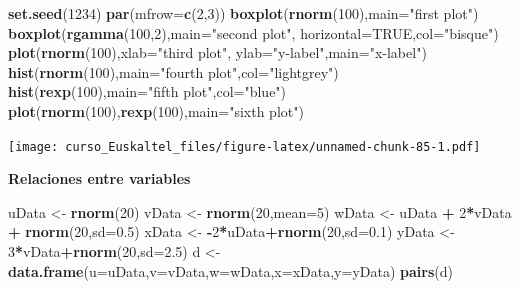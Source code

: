 \documentclass[]{book}
\newenvironment{Shaded}{\begin{snugshade}}{\end{snugshade}}
\newcommand{\KeywordTok}[1]{\textcolor[rgb]{0.13,0.29,0.53}{\textbf{#1}}}
\newcommand{\DataTypeTok}[1]{\textcolor[rgb]{0.13,0.29,0.53}{#1}}
\newcommand{\DecValTok}[1]{\textcolor[rgb]{0.00,0.00,0.81}{#1}}
\newcommand{\FloatTok}[1]{\textcolor[rgb]{0.00,0.00,0.81}{#1}}
\newcommand{\StringTok}[1]{\textcolor[rgb]{0.31,0.60,0.02}{#1}}
\newcommand{\OtherTok}[1]{\textcolor[rgb]{0.56,0.35,0.01}{#1}}
\newcommand{\OperatorTok}[1]{\textcolor[rgb]{0.81,0.36,0.00}{\textbf{#1}}}
\newcommand{\NormalTok}[1]{#1}
\begin{document}
\begin{Shaded}
\begin{Highlighting}[]
\KeywordTok{set.seed}\NormalTok{(}\DecValTok{1234}\NormalTok{)}
 \KeywordTok{par}\NormalTok{(}\DataTypeTok{mfrow=}\KeywordTok{c}\NormalTok{(}\DecValTok{2}\NormalTok{,}\DecValTok{3}\NormalTok{))}
 \KeywordTok{boxplot}\NormalTok{(}\KeywordTok{rnorm}\NormalTok{(}\DecValTok{100}\NormalTok{),}\DataTypeTok{main=}\StringTok{"first plot"}\NormalTok{)}
 \KeywordTok{boxplot}\NormalTok{(}\KeywordTok{rgamma}\NormalTok{(}\DecValTok{100}\NormalTok{,}\DecValTok{2}\NormalTok{),}\DataTypeTok{main=}\StringTok{"second plot"}\NormalTok{, }\DataTypeTok{horizontal=}\OtherTok{TRUE}\NormalTok{,}\DataTypeTok{col=}\StringTok{"bisque"}\NormalTok{)}
 \KeywordTok{plot}\NormalTok{(}\KeywordTok{rnorm}\NormalTok{(}\DecValTok{100}\NormalTok{),}\DataTypeTok{xlab=}\StringTok{"third plot"}\NormalTok{,}
      \DataTypeTok{ylab=}\StringTok{"y-label"}\NormalTok{,}\DataTypeTok{main=}\StringTok{"x-label"}\NormalTok{)}
 \KeywordTok{hist}\NormalTok{(}\KeywordTok{rnorm}\NormalTok{(}\DecValTok{100}\NormalTok{),}\DataTypeTok{main=}\StringTok{"fourth plot"}\NormalTok{,}\DataTypeTok{col=}\StringTok{"lightgrey"}\NormalTok{)}
 \KeywordTok{hist}\NormalTok{(}\KeywordTok{rexp}\NormalTok{(}\DecValTok{100}\NormalTok{),}\DataTypeTok{main=}\StringTok{"fifth plot"}\NormalTok{,}\DataTypeTok{col=}\StringTok{"blue"}\NormalTok{)}
 \KeywordTok{plot}\NormalTok{(}\KeywordTok{rnorm}\NormalTok{(}\DecValTok{100}\NormalTok{),}\KeywordTok{rexp}\NormalTok{(}\DecValTok{100}\NormalTok{),}\DataTypeTok{main=}\StringTok{"sixth plot"}\NormalTok{)}
\end{Highlighting}
\end{Shaded}

\texttt{[image: curso\_Euskaltel\_files/figure-latex/unnamed-chunk-85-1.pdf]}

\textbf{Relaciones entre variables}

\begin{Shaded}
\begin{Highlighting}[]
\NormalTok{uData <-}\StringTok{ }\KeywordTok{rnorm}\NormalTok{(}\DecValTok{20}\NormalTok{)}
\NormalTok{vData <-}\StringTok{ }\KeywordTok{rnorm}\NormalTok{(}\DecValTok{20}\NormalTok{,}\DataTypeTok{mean=}\DecValTok{5}\NormalTok{)}
\NormalTok{wData <-}\StringTok{ }\NormalTok{uData }\OperatorTok{+}\StringTok{ }\DecValTok{2}\OperatorTok{*}\NormalTok{vData }\OperatorTok{+}\StringTok{ }\KeywordTok{rnorm}\NormalTok{(}\DecValTok{20}\NormalTok{,}\DataTypeTok{sd=}\FloatTok{0.5}\NormalTok{)}
\NormalTok{xData <-}\StringTok{ }\OperatorTok{-}\DecValTok{2}\OperatorTok{*}\NormalTok{uData}\OperatorTok{+}\KeywordTok{rnorm}\NormalTok{(}\DecValTok{20}\NormalTok{,}\DataTypeTok{sd=}\FloatTok{0.1}\NormalTok{)}
\NormalTok{yData <-}\StringTok{  }\DecValTok{3}\OperatorTok{*}\NormalTok{vData}\OperatorTok{+}\KeywordTok{rnorm}\NormalTok{(}\DecValTok{20}\NormalTok{,}\DataTypeTok{sd=}\FloatTok{2.5}\NormalTok{)}
\NormalTok{d <-}\StringTok{ }\KeywordTok{data.frame}\NormalTok{(}\DataTypeTok{u=}\NormalTok{uData,}\DataTypeTok{v=}\NormalTok{vData,}\DataTypeTok{w=}\NormalTok{wData,}\DataTypeTok{x=}\NormalTok{xData,}\DataTypeTok{y=}\NormalTok{yData)}
\KeywordTok{pairs}\NormalTok{(d)}
\end{Highlighting}
\end{Shaded}
\end{document}
